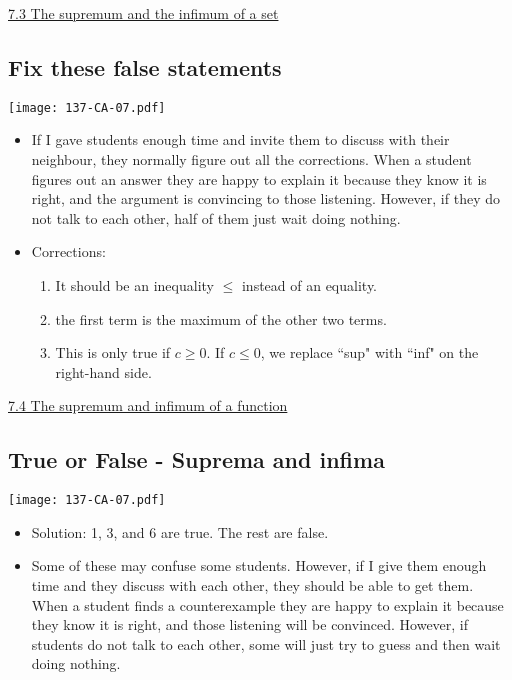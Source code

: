\documentclass[11pt]{article}
\newcommand{\nl}{\hfill \vspace{-1.1\baselineskip}} %
\newcommand{\viii}{\hspace{8mm} \href{https://www.youtube.com/watch?v=4qNstDwlh9I&list=PLlwePzQY_wW9vqCkUudCmoOvnNmr9vMuJ&index=3}{7.3 The supremum and the infimum of a set}}
\newcommand{\viv}{\hspace{8mm} \href{https://www.youtube.com/watch?v=YgXv698pN8g&list=PLlwePzQY_wW9vqCkUudCmoOvnNmr9vMuJ&index=4}{7.4 The supremum and infimum of a function}}
\begin{document}
\begin{videos}
\viii
\end{videos}

\newpage
\subsection{Fix these false statements}

\begin{center}
{ \texttt{[image: 137-CA-07.pdf]}} 
\end{center}

\begin{comments}
\nl
	\begin{itemize}
		\item  If I gave students enough time and invite them to discuss with their neighbour, they normally figure out all the corrections.  When a student figures out an answer they are happy to explain it because they know it is right, and the argument is convincing to those listening.  However, if they do not talk to each other, half of them just wait doing nothing.
		\item Corrections:
			\begin{enumerate}
				\item It should be an inequality $\leq$ instead of an equality.
				\item the first term is the maximum of the other two terms.
				\item This is only true if $c \geq 0$.  If $c \leq 0$, we replace ``sup" with ``inf" on the right-hand side.
			\end{enumerate}
	\end{itemize}
\end{comments}

\begin{videos}
\viv
\end{videos}

\newpage
\subsection{True or False - Suprema and infima}

\begin{center}
{ \texttt{[image: 137-CA-07.pdf]}} 
\end{center}

\begin{comments}
\nl
	\begin{itemize}
		\item Solution: 1, 3, and 6 are true.  The rest are false.
		\item  Some of these may confuse some students.  However, if I give them enough time and they discuss with each other, they should be able to get them.  When a student finds a counterexample they are happy to explain it  because they know it is right, and those listening will be convinced.  However, if students do not talk to each other, some will just try to guess and then wait doing nothing.
	\end{itemize}
\end{comments}
\end{document}
